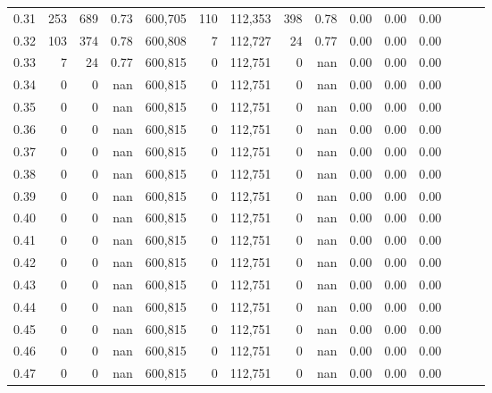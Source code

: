 \begin{tabular}{rrrrrrrrrrrrrrr}
0.31 &      253 &     689 &  0.73 &  600,705 &      110 &  112,353 &      398 &  0.78 &  0.00 &  0.00 &      0.00 \\
0.32 &      103 &     374 &  0.78 &  600,808 &        7 &  112,727 &       24 &  0.77 &  0.00 &  0.00 &      0.00 \\
0.33 &        7 &      24 &  0.77 &  600,815 &        0 &  112,751 &        0 &   nan &  0.00 &  0.00 &      0.00 \\
0.34 &        0 &       0 &   nan &  600,815 &        0 &  112,751 &        0 &   nan &  0.00 &  0.00 &      0.00 \\
0.35 &        0 &       0 &   nan &  600,815 &        0 &  112,751 &        0 &   nan &  0.00 &  0.00 &      0.00 \\
0.36 &        0 &       0 &   nan &  600,815 &        0 &  112,751 &        0 &   nan &  0.00 &  0.00 &      0.00 \\
0.37 &        0 &       0 &   nan &  600,815 &        0 &  112,751 &        0 &   nan &  0.00 &  0.00 &      0.00 \\
0.38 &        0 &       0 &   nan &  600,815 &        0 &  112,751 &        0 &   nan &  0.00 &  0.00 &      0.00 \\
0.39 &        0 &       0 &   nan &  600,815 &        0 &  112,751 &        0 &   nan &  0.00 &  0.00 &      0.00 \\
0.40 &        0 &       0 &   nan &  600,815 &        0 &  112,751 &        0 &   nan &  0.00 &  0.00 &      0.00 \\
0.41 &        0 &       0 &   nan &  600,815 &        0 &  112,751 &        0 &   nan &  0.00 &  0.00 &      0.00 \\
0.42 &        0 &       0 &   nan &  600,815 &        0 &  112,751 &        0 &   nan &  0.00 &  0.00 &      0.00 \\
0.43 &        0 &       0 &   nan &  600,815 &        0 &  112,751 &        0 &   nan &  0.00 &  0.00 &      0.00 \\
0.44 &        0 &       0 &   nan &  600,815 &        0 &  112,751 &        0 &   nan &  0.00 &  0.00 &      0.00 \\
0.45 &        0 &       0 &   nan &  600,815 &        0 &  112,751 &        0 &   nan &  0.00 &  0.00 &      0.00 \\
0.46 &        0 &       0 &   nan &  600,815 &        0 &  112,751 &        0 &   nan &  0.00 &  0.00 &      0.00 \\
0.47 &        0 &       0 &   nan &  600,815 &        0 &  112,751 &        0 &   nan &  0.00 &  0.00 &      0.00 \\

\end{tabular}
